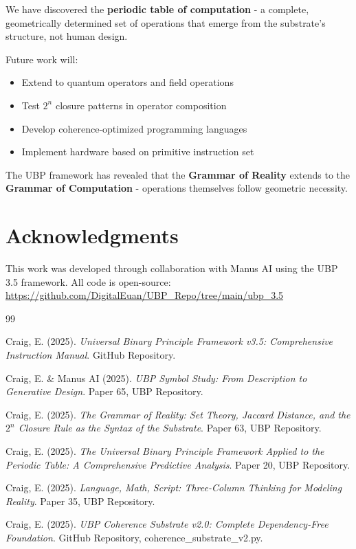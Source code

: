 \documentclass[12pt,a4paper]{article}
\begin{document}
We have discovered the \textbf{periodic table of computation} - a complete, geometrically determined set of operations that emerge from the substrate's structure, not human design.

Future work will:
\begin{itemize}
    \item Extend to quantum operators and field operations
    \item Test $2^n$ closure patterns in operator composition
    \item Develop coherence-optimized programming languages
    \item Implement hardware based on primitive instruction set
\end{itemize}

The UBP framework has revealed that the \textbf{Grammar of Reality} extends to the \textbf{Grammar of Computation} - operations themselves follow geometric necessity.

\section*{Acknowledgments}

This work was developed through collaboration with Manus AI using the UBP 3.5 framework. All code is open-source: \url{https://github.com/DigitalEuan/UBP_Repo/tree/main/ubp_3.5}

\begin{thebibliography}{99}

Craig, E. (2025). \emph{Universal Binary Principle Framework v3.5: Comprehensive Instruction Manual}. GitHub Repository.

Craig, E. \& Manus AI (2025). \emph{UBP Symbol Study: From Description to Generative Design}. Paper 65, UBP Repository.

Craig, E. (2025). \emph{The Grammar of Reality: Set Theory, Jaccard Distance, and the $2^n$ Closure Rule as the Syntax of the Substrate}. Paper 63, UBP Repository.

Craig, E. (2025). \emph{The Universal Binary Principle Framework Applied to the Periodic Table: A Comprehensive Predictive Analysis}. Paper 20, UBP Repository.

Craig, E. (2025). \emph{Language, Math, Script: Three-Column Thinking for Modeling Reality}. Paper 35, UBP Repository.

Craig, E. (2025). \emph{UBP Coherence Substrate v2.0: Complete Dependency-Free Foundation}. GitHub Repository, coherence\_substrate\_v2.py.

\end{thebibliography}
\end{document}
